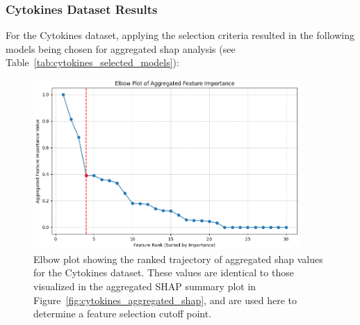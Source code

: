 \documentclass[12pt,a4paper]{report}
\begin{document}
\subsubsection*{Cytokines Dataset Results}

For the Cytokines dataset, applying the selection criteria resulted in the following models being chosen for aggregated \gls{shap} analysis (see Table~\ref{tab:cytokines_selected_models}):

\begin{table}[H]
    \centering
    \caption[Selected Models for Cytokines]{Models selected for aggregated SHAP analysis for the Cytokines dataset.}
    \label{tab:cytokines_selected_models}
\end{table}
\begin{figure}[h!]
    \centering
    \includegraphics[width=0.9\textwidth]{images/elbow_plot_cytokines_uncompressed.png}
    \caption[Elbow plot for Cytokines]{Elbow plot showing the ranked trajectory of aggregated \gls{shap} values for the Cytokines dataset. These values are identical to those visualized in the aggregated SHAP summary plot in Figure~\ref{fig:cytokines_aggregated_shap}, and are used here to determine a feature selection cutoff point.}
    \label{fig:elbow_plot_cytokines_uncompressed}
\end{figure}
\end{document}
